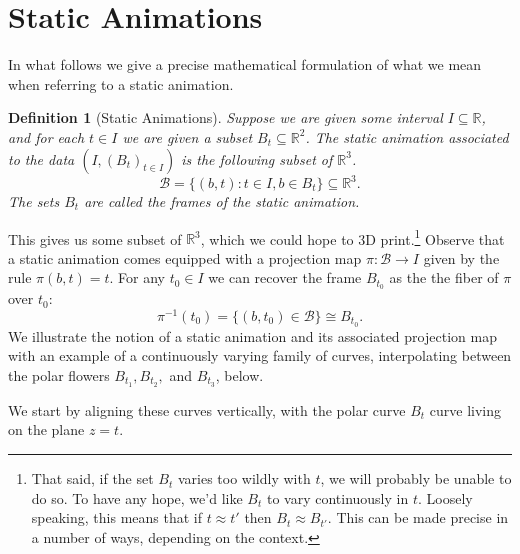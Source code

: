 \documentclass[12 pt]{article}
\newcommand{\bR}{\mathbb{R}}
\newcommand{\cB}{\mathcal{B}}
\newtheorem{definition}{Definition}
\begin{document}
\section{Static Animations}\label{Theory}
In what follows we give a precise mathematical formulation of what we mean when referring to a static animation.
\begin{definition}[Static Animations]\label{maindef}
    Suppose we are given some interval $I\subseteq\mathbb{R}$, and for each $t\in I$ we are given a subset $B_t\subseteq\mathbb{R}^2$.  The \textit{static animation} associated to the data $(I,(B_t)_{t\in I})$ is the following subset of $\bR^3$.
    \[\cB = \{(b,t):t\in I,b\in B_t\}\subseteq\bR^3.\]
    The sets $B_t$ are called the \textit{frames} of the static animation.
\end{definition}
This gives us some subset of $\bR^3$, which we could hope to 3D print.\footnote{That said, if the set $B_t$ varies too wildly with $t$, we will probably be unable to do so.  To have any hope, we'd like $B_t$ to vary continuously in $t$.  Loosely speaking, this means that if $t\approx t'$ then $B_t\approx B_{t'}$.  This can be made precise in a number of ways, depending on the context.}  Observe that a static animation comes equipped with a projection map $\pi:\cB\to I$ given by the rule $\pi(b,t) = t$.  For any $t_0\in I$ we can recover the frame $B_{t_0}$ as the the fiber of $\pi$ over $t_0$:
\[\pi^{-1}(t_0) = \{(b,t_0)\in\cB\} \cong B_{t_0}.\]
We illustrate the notion of a static animation and its associated projection map with an example of a continuously varying family of curves, interpolating between the polar flowers $B_{t_1},B_{t_2},$ and $B_{t_3}$, below.
\begin{center}
\end{center}
We start by aligning these curves vertically, with the polar curve $B_t$ curve living on the plane $z=t$.
\end{document}
